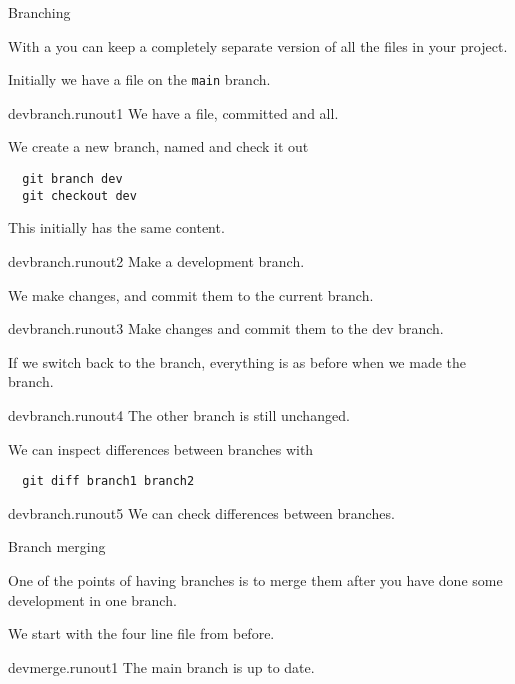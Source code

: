  {Branching}

With a  you can keep a completely
separate version of all the files in your project.

Initially we have a file on the \lstinline{main} branch.

\begin{gitstep}{devbranch.runout1}
  We have a file, committed and all.
\end{gitstep}

We create a new branch, named 
and check it out
\begin{lstlisting}
  git branch dev
  git checkout dev
\end{lstlisting}
This initially has the same content.

\begin{gitstep}{devbranch.runout2}
  Make a development branch.
\end{gitstep}

We make changes, and commit them to the current branch.

\begin{gitstep}{devbranch.runout3}
  Make changes and commit them to the dev branch.
\end{gitstep}

If we switch back to the  branch,
everything is as before when we made the  branch.

\begin{gitstep}{devbranch.runout4}
  The other branch is still unchanged.
\end{gitstep}

We can inspect differences between branches with 
\begin{lstlisting}
  git diff branch1 branch2
\end{lstlisting}

\begin{gitstep}{devbranch.runout5}
  We can check differences between branches.
\end{gitstep}

 {Branch merging}
\label{sec:git-branch-merge}

One of the points of having branches is to merge
them after you have done some development in one branch.

We start with the four line file from before.

\begin{gitstep}{devmerge.runout1}
  The main branch is up to date.
\end{gitstep}


